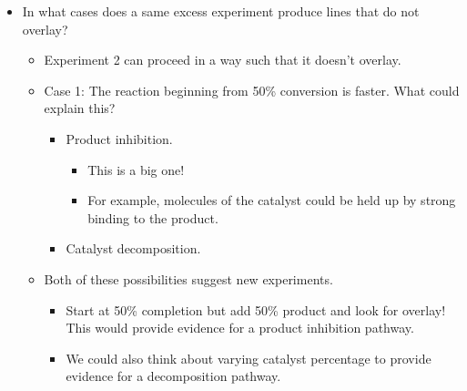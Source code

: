 \documentclass[../notes.tex]{subfiles}
\begin{document}
\begin{itemize}
\begin{itemize}
\begin{itemize}
\begin{itemize}
                \item The excess is the same as last time: \SI{0.02}{\milli\mole}!
            \end{itemize}
        \end{itemize}
        \item If the reaction is behaving in a well-defined way, we should see overlay via visual inspection of the rates in the derivative plot (Figure \ref{fig:sameExcessb}).
        \begin{itemize}
            \item Thus, we can assay whether the rates of two experiments are the same by whether or not the lines visually overlay.
            \item Overlay is commonly the case, but in cases where we \emph{don't} get overlay, we get something really illuminating.
        \end{itemize}
    \end{itemize}
    \item In what cases does a same excess experiment produce lines that do not overlay?
    \begin{itemize}
        \item Experiment 2 can proceed in a way such that it doesn't overlay.
        \item Case 1: The reaction beginning from 50\% conversion is faster. What could explain this?
        \begin{itemize}
            \item Product inhibition.
            \begin{itemize}
                \item This is a big one!
                \item For example, molecules of the catalyst could be held up by strong binding to the product.
            \end{itemize}
            \item Catalyst decomposition.
        \end{itemize}
        \item Both of these possibilities suggest new experiments.
        \begin{itemize}
            \item Start at 50\% completion but add 50\% product and look for overlay! This would provide evidence for a product inhibition pathway.
            \item We could also think about varying catalyst percentage to provide evidence for a decomposition pathway.

\end{itemize}
\end{itemize}
\end{itemize}
\end{document}
